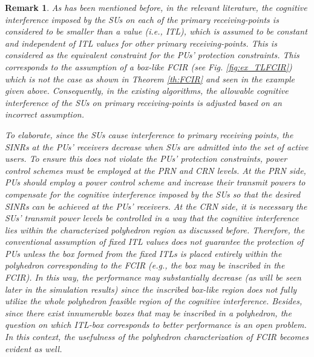 \documentclass[journal,twoside]{IEEEtran}
\newtheorem {remark}{Remark}
\begin{document}
\begin{remark}
	\label{rmk:bad_concept}
		As has been mentioned before, in the relevant literature, the cognitive interference imposed by the SUs on each of the primary receiving-points is considered to be smaller than a  value (i.e., ITL), which is assumed to be constant and independent of ITL values for other primary receiving-points.  This  is considered as the equivalent constraint for the  PUs' protection constraints. This corresponds to the assumption of a box-like FCIR (see Fig. \ref{fig:ex_TLFCIR}) which is not the case as shown in Theorem \ref{th:FCIR} and seen in the example given above.  Consequently, in the existing algorithms, the allowable cognitive interference of the SUs on primary receiving-points  is adjusted based on an incorrect assumption. 
		


			To elaborate, since the SUs cause interference to primary receiving points,  the SINRs at the PUs' receivers decrease when SUs are admitted into the set of active users. To ensure this does not violate the PUs' protection constraints, power control schemes must be employed at the PRN and CRN levels. At the PRN side, PUs should  employ a power control scheme and increase their transmit powers to compensate for the cognitive interference imposed by the SUs so that the desired SINRs can be achieved at the PUs' receivers. At the CRN side, it is necessary the SUs' transmit  power levels be controlled in a way that the cognitive interference lies within the characterized polyhedron region as discussed before. Therefore, the conventional assumption of fixed ITL values does not guarantee the protection of PUs unless the box formed from the fixed ITLs is placed entirely within the polyhedron corresponding to the FCIR (e.g., the box may be inscribed in the FCIR). In this way, the performance may substantially decrease (as will be seen later in the simulation results) since the inscribed box-like region does not fully utilize the whole polyhedron feasible region of the cognitive interference. Besides, since there exist innumerable boxes that may be inscribed in a polyhedron, the question on which ITL-box corresponds to better performance is an open problem. In this context, the usefulness of the polyhedron characterization of FCIR  becomes evident as well.

		
	\end{remark}
\end{document}
